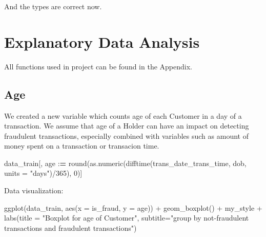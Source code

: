 \documentclass[
]{report}
\newenvironment{Shaded}{\begin{snugshade}}{\end{snugshade}}
\newcommand{\AttributeTok}[1]{\textcolor[rgb]{0.77,0.63,0.00}{#1}}
\newcommand{\DecValTok}[1]{\textcolor[rgb]{0.00,0.00,0.81}{#1}}
\newcommand{\ErrorTok}[1]{\textcolor[rgb]{0.64,0.00,0.00}{\textbf{#1}}}
\newcommand{\FunctionTok}[1]{\textcolor[rgb]{0.00,0.00,0.00}{#1}}
\newcommand{\NormalTok}[1]{#1}
\newcommand{\SpecialCharTok}[1]{\textcolor[rgb]{0.00,0.00,0.00}{#1}}
\newcommand{\StringTok}[1]{\textcolor[rgb]{0.31,0.60,0.02}{#1}}
\begin{document}
And the types are correct now.

\hypertarget{explanatory-data-analysis}{%
\section{Explanatory Data Analysis}\label{explanatory-data-analysis}}

All functions used in project can be found in the Appendix.

\hypertarget{age}{%
\subsection{Age}\label{age}}

We created a new variable which counts age of each Customer in a day of
a transaction. We assume that age of a Holder can have an impact on
detecting fraudulent transactions, especially combined with variables
such as amount of money spent on a transaction or transacion time.

\begin{Shaded}
\begin{Highlighting}[]
\NormalTok{data\_train[, age }\SpecialCharTok{:}\ErrorTok{=} \FunctionTok{round}\NormalTok{(}\FunctionTok{as.numeric}\NormalTok{(}\FunctionTok{difftime}\NormalTok{(trans\_date\_trans\_time, dob, }\AttributeTok{units =} \StringTok{"days"}\NormalTok{)}\SpecialCharTok{/}\DecValTok{365}\NormalTok{), }\DecValTok{0}\NormalTok{)]}
\end{Highlighting}
\end{Shaded}

Data visualization:

\begin{Shaded}
\begin{Highlighting}[]
\FunctionTok{ggplot}\NormalTok{(data\_train, }\FunctionTok{aes}\NormalTok{(}\AttributeTok{x =}\NormalTok{ is\_fraud, }\AttributeTok{y =}\NormalTok{ age)) }\SpecialCharTok{+}
  \FunctionTok{geom\_boxplot}\NormalTok{() }\SpecialCharTok{+}
\NormalTok{  my\_style }\SpecialCharTok{+}
  \FunctionTok{labs}\NormalTok{(}\AttributeTok{title =} \StringTok{"Boxplot for age of Customer"}\NormalTok{,}
       \AttributeTok{subtitle=}\StringTok{"group by not{-}fraudulent transactions and fraudulent transactions"}\NormalTok{)}
\end{Highlighting}
\end{Shaded}
\end{document}

